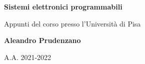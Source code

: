 \begin{titlepage}
    \begin{center}
        \vspace*{1cm}

        \huge
        \textbf{Sistemi elettronici programmabili}

        \vspace{0.5cm}

        Appunti del corso presso l'Università di Pisa

        \vspace{1.5cm}

        \textbf{Aleandro Prudenzano}

        \vfill
        \vspace{0.8cm}

        A.A. 2021-2022

    \end{center}
\end{titlepage}

\clearpage
\begingroup
  \pagestyle{empty}
  \null
  \newpage
\endgroup

\renewcommand{\contentsname}{Indice}
\tableofcontents

\clearpage
\begingroup
  \pagestyle{empty}
  \null
  \newpage
\endgroup